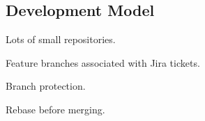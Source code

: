 \subsection{Development Model}

Lots of small repositories.

Feature branches associated with Jira tickets.

Branch protection.

Rebase before merging.


